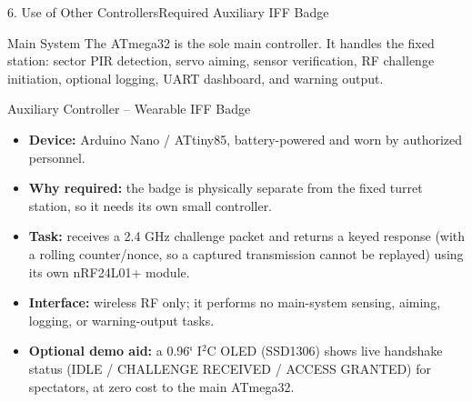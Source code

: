 \documentclass[aspectratio=169, 10pt]{beamer}
\begin{document}
\begin{frame}{6. Use of Other Controllers}{Required Auxiliary IFF Badge}
    \begin{block}{Main System}
        \footnotesize The ATmega32 is the sole main controller. It handles the fixed station: sector PIR detection, servo aiming, sensor verification, RF challenge initiation, optional logging, UART dashboard, and warning output.
    \end{block}
    \vspace{-0.05cm}
    \begin{block}{Auxiliary Controller -- Wearable IFF Badge}
        \footnotesize
        \begin{itemize}
            \item \textbf{Device:} Arduino Nano / ATtiny85, battery-powered and worn by authorized personnel.
            \item \textbf{Why required:} the badge is physically separate from the fixed turret station, so it needs its own small controller.
            \item \textbf{Task:} receives a 2.4 GHz challenge packet and returns a keyed response (with a rolling counter/nonce, so a captured transmission cannot be replayed) using its own nRF24L01+ module.
            \item \textbf{Interface:} wireless RF only; it performs no main-system sensing, aiming, logging, or warning-output tasks.
            \item \textbf{Optional demo aid:} a 0.96\char`\"{} I$^2$C OLED (SSD1306) shows live handshake status (IDLE / CHALLENGE RECEIVED / ACCESS GRANTED) for spectators, at zero cost to the main ATmega32.
        \end{itemize}
    \end{block}
\end{frame}
\end{document}
